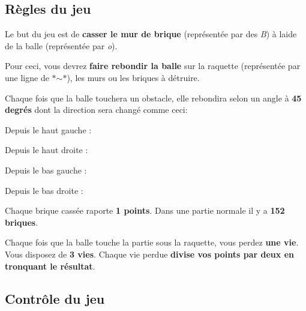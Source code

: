 \subsection*{Règles du jeu}

Le but du jeu est de {\bfseries casser le mur de brique} (représentée par des {\itshape B}) à l\textquotesingle{}aide de la balle (représentée par {\itshape o}).

Pour ceci, vous devrez {\bfseries faire rebondir la balle} sur la raquette (représentée par une ligne de $\ast$$\sim$$\ast$), les murs ou les briques à détruire.

Chaque fois que la balle touchera un obstacle, elle rebondira selon un angle à {\bfseries 45 degrés} dont la direction sera changé comme ceci\+:
\begin{DoxyItemize}
\item Depuis le haut gauche \+:
\end{DoxyItemize}




\begin{DoxyItemize}
\item Depuis le haut droite \+:
\end{DoxyItemize}




\begin{DoxyItemize}
\item Depuis le bas gauche \+:
\end{DoxyItemize}




\begin{DoxyItemize}
\item Depuis le bas droite \+:
\end{DoxyItemize}



Chaque brique cassée raporte {\bfseries 1 points}. Dans une partie normale il y a {\bfseries 152 briques}.

Chaque fois que la balle touche la partie sous la raquette, vous perdez {\bfseries une vie}. Vous disposez de {\bfseries 3 vies}. Chaque vie perdue {\bfseries divise vos points par deux en tronquant le résultat}.

\subsection*{Contrôle du jeu}


